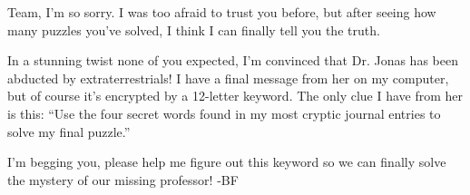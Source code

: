Team, I'm so sorry. I was too afraid to trust you before, but after
seeing how many puzzles you've solved, I think I can finally tell
you the truth.

In a stunning twist none of you expected, I'm convinced that Dr.
Jonas has been abducted by extraterrestrials! I have a final
message from her on my computer, but of course it's encrypted
by a 12-letter keyword. The only clue I have from her is this:
``Use the four secret words
found in my most cryptic journal entries to solve my final
puzzle.''

I'm begging you, please help me figure out this keyword
so we can finally solve the mystery of our missing
professor! -BF
